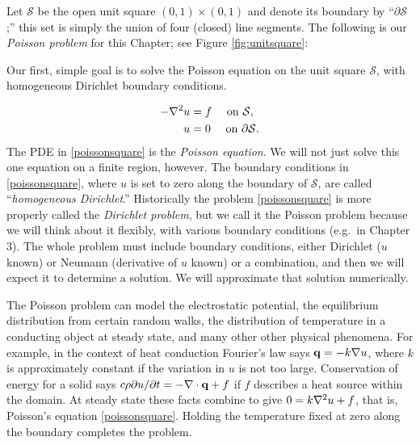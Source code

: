 Let $\mathcal{S}$ be the open unit square $(0,1)\times(0,1)$ and denote its boundary by ``$\partial\mathcal{S}$;'' this set is simply the union of four (closed) line segments.  The following is our \emph{Poisson problem} for this Chapter;  see Figure \ref{fig:unitsquare}:
\begin{marginfigure}
\caption{Our first, simple goal is to solve the Poisson equation on the unit square $\mathcal{S}$, with homogeneous Dirichlet boundary conditions.}
\label{fig:unitsquare}
\end{marginfigure}
\begin{align}
- \nabla^2 u &= f \quad \text{ on } \mathcal{S}, \label{poissonsquare} \\
u &= 0 \quad \text{ on } \partial \mathcal{S}. \notag
\end{align}
The PDE in \eqref{poissonsquare} is the \emph{Poisson equation}.  We will not just solve this one equation on a finite region, however.  The boundary conditions in \eqref{poissonsquare}, where $u$ is set to zero along the boundary of $\mathcal{S}$, are called ``\emph{homogeneous Dirichlet}.''  Historically the problem \eqref{poissonsquare} is more properly called the \emph{Dirichlet problem}, but we call it the Poisson problem because we will think about it flexibly, with various boundary conditions (e.g.~in Chapter 3).  The whole problem must include boundary conditions, either Dirichlet ($u$ known) or Neumann (derivative of $u$ known) or a combination, and then we will expect it to determine a solution.  We will approximate that solution numerically.

The Poisson problem can model the electrostatic potential, the equilibrium distribution from certain random walks, the distribution of temperature in a conducting object at steady state, and many other other physical phenomena.  For example, in the context of heat conduction Fourier's law says $\mathbf{q} = -k \nabla u$, where $k$ is approximately constant if the variation in $u$ is not too large.  Conservation of energy for a solid says $c\rho \partial u/\partial t = - \nabla\cdot\mathbf{q} + f$ if $f$ describes a heat source within the domain.  At steady state these facts combine to give $0 = k \nabla^2 u + f$, that is, Poisson's equation \eqref{poissonsquare}.  Holding the temperature fixed at zero along the boundary completes the problem.

